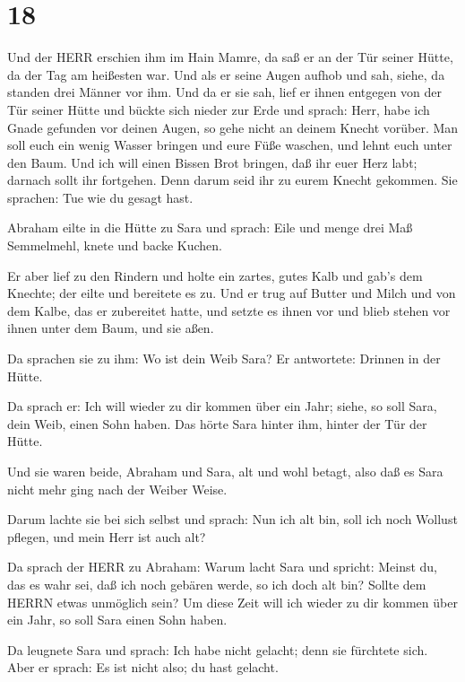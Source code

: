 \hypertarget{section-17}{%
\section{18}\label{section-17}}

 Und der HERR erschien ihm im Hain Mamre, da saß er an der
Tür seiner Hütte, da der Tag am heißesten war.  Und als er
seine Augen aufhob und sah, siehe, da standen drei Männer vor ihm. Und
da er sie sah, lief er ihnen entgegen von der Tür seiner Hütte und
bückte sich nieder zur Erde  und sprach: Herr, habe ich
Gnade gefunden vor deinen Augen, so gehe nicht an deinem Knecht vorüber.
 Man soll euch ein wenig Wasser bringen und eure Füße
waschen, und lehnt euch unter den Baum.  Und ich will einen
Bissen Brot bringen, daß ihr euer Herz labt; darnach sollt ihr
fortgehen. Denn darum seid ihr zu eurem Knecht gekommen. Sie sprachen:
Tue wie du gesagt hast.

 Abraham eilte in die Hütte zu Sara und sprach: Eile und
menge drei Maß Semmelmehl, knete und backe Kuchen.

 Er aber lief zu den Rindern und holte ein zartes, gutes
Kalb und gab's dem Knechte; der eilte und bereitete es zu. 
Und er trug auf Butter und Milch und von dem Kalbe, das er zubereitet
hatte, und setzte es ihnen vor und blieb stehen vor ihnen unter dem
Baum, und sie aßen.

 Da sprachen sie zu ihm: Wo ist dein Weib Sara? Er
antwortete: Drinnen in der Hütte.

 Da sprach er: Ich will wieder zu dir kommen über ein Jahr;
siehe, so soll Sara, dein Weib, einen Sohn haben. Das hörte Sara hinter
ihm, hinter der Tür der Hütte.

 Und sie waren beide, Abraham und Sara, alt und wohl
betagt, also daß es Sara nicht mehr ging nach der Weiber Weise.

 Darum lachte sie bei sich selbst und sprach: Nun ich alt
bin, soll ich noch Wollust pflegen, und mein Herr ist auch alt?

 Da sprach der HERR zu Abraham: Warum lacht Sara und
spricht: Meinst du, das es wahr sei, daß ich noch gebären werde, so ich
doch alt bin?  Sollte dem HERRN etwas unmöglich sein? Um
diese Zeit will ich wieder zu dir kommen über ein Jahr, so soll Sara
einen Sohn haben.

 Da leugnete Sara und sprach: Ich habe nicht gelacht; denn
sie fürchtete sich. Aber er sprach: Es ist nicht also; du hast gelacht.


